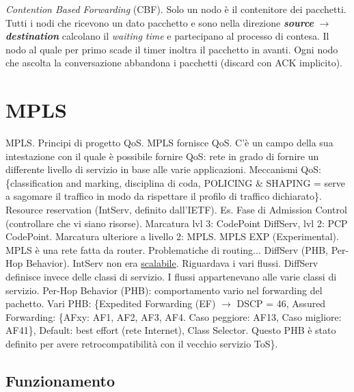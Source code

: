 \textit{Contention Based Forwarding} (CBF). Solo un nodo è il contenitore dei pacchetti. Tutti i nodi che ricevono un dato pacchetto e sono nella direzione \textit{\textbf{source}} $\rightarrow$ \textit{\textbf{destination}} calcolano il \textit{waiting time} e partecipano al processo di contesa. Il nodo al quale per primo scade il timer inoltra il pacchetto in avanti. Ogni nodo che ascolta la conversazione abbandona i pacchetti (discard con ACK implicito).



\section{MPLS}

MPLS. Principi di progetto QoS. MPLS fornisce QoS. C'è un campo della sua intestazione con il quale è possibile fornire QoS: rete in grado di fornire un differente livello di servizio in base alle varie applicazioni. Meccanismi QoS: \{classification and marking, disciplina di coda, POLICING \& SHAPING = serve a sagomare il traffico in modo da rispettare il profilo di traffico dichiarato\}. Resource reservation (IntServ, definito dall'IETF). Es. Fase di Admission Control (controllare che vi siano risorse). Marcatura lvl 3: CodePoint DiffServ, lvl 2: PCP CodePoint. Marcatura ulteriore a livello 2: MPLS. MPLS EXP (Experimental). MPLS è una rete fatta da router. Problematiche di routing... DiffServ (PHB, Per-Hop Behavior). IntServ non era \underline{scalabile}. Riguardava i vari flussi. DiffServ definisce invece delle classi di servizio. I flussi appartenevano alle varie classi di servizio. Per-Hop Behavior (PHB): comportamento vario nel forwarding del pachetto. Vari PHB: \{Expedited Forwarding (EF) $\rightarrow$ DSCP = 46, Assured Forwarding: \{AFxy: AF1, AF2, AF3, AF4. Caso peggiore: AF13, Caso migliore: AF41\}, Default: best effort (rete Internet), Class Selector. Questo PHB è stato definito per avere retrocompatibilità con il vecchio servizio ToS\}.

\subsection{Funzionamento} 

